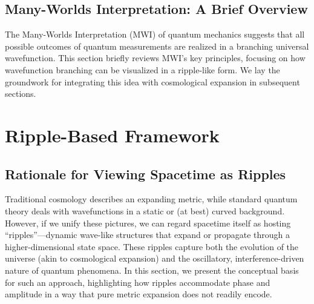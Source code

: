 \documentclass[11pt]{article}
\begin{document}
\subsection{Many-Worlds Interpretation: A Brief Overview}
\label{subsec:manyworlds-overview}
The Many-Worlds Interpretation (MWI) of quantum mechanics suggests that 
all possible outcomes of quantum measurements are realized in a 
branching universal wavefunction. This section briefly reviews MWI’s 
key principles, focusing on how wavefunction branching can be visualized 
in a ripple-like form. We lay the groundwork for integrating this idea 
with cosmological expansion in subsequent sections.


\section{Ripple-Based Framework}
\label{sec:ripple-framework}

\subsection{Rationale for Viewing Spacetime as Ripples}
\label{subsec:rationale-ripples}
Traditional cosmology describes an expanding metric, while standard quantum theory deals with wavefunctions in a static or (at best) curved background. 
However, if we unify these pictures, we can regard spacetime itself as hosting 
``ripples''---dynamic wave-like structures that expand or propagate through a 
higher-dimensional state space. 
These ripples capture both the evolution of the universe (akin to cosmological expansion) 
and the oscillatory, interference-driven nature of quantum phenomena. 
In this section, we present the conceptual basis for such an approach, highlighting 
how ripples accommodate phase and amplitude in a way that pure metric expansion 
does not readily encode.
\end{document}
